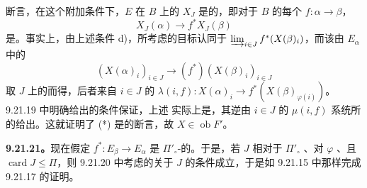 断言，在这个附加条件下，$E$ 在 $B$ 上的 $X_J$ 是的，即对于 $B$ 的每个 $f:\alpha\to\beta$，
\[
X_J(\alpha)\longrightarrow f^*X_J(\beta)\tag{*}
\]
是。事实上，由上述条件 d)，所考虑的目标认同于 $\varinjlim_{i\in J}f^*(X(\beta)_i)$，而该由 $E_\alpha$ 中的 
\[
(X(\alpha)_i)_{i\in J}\longrightarrow (f^*)(X(\beta)_i)_{i\in J}
\]
取 $J$ 上的而得，后者来自 $i\in J$ 的 $\lambda(i,f):X(\alpha)_i\to f^*(X(\beta)_{\varphi(i)})$。9.21.19 中明确给出的条件保证，上述 实际上是，其逆由 $i\in J$ 的 $\mu(i,f)$ 系统所的给出。这就证明了 (*) 是的断言，故 $X\in\operatorname{ob}F'$。

\textbf{9.21.21。}现在假定 $f^*:E_\beta\to E_\alpha$ 是 $\Pi'_\circ$-的。于是，若 $J$ 相对于 $\Pi'_\circ$ 、对 $\varphi$ 、且 $\operatorname{card}J\leq\Pi$，则 9.21.20 中考虑的关于 $J$ 的条件成立，于是如 9.21.15 中那样完成 9.21.17 的证明。

